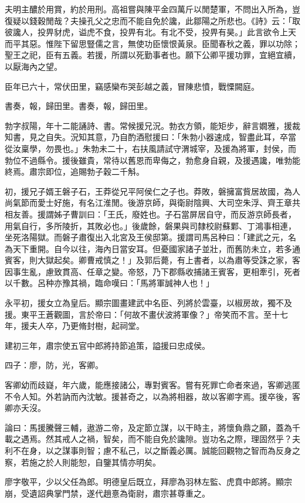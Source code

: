 \begin{pinyinscope}
夫明主醲於用賞，約於用刑。高祖嘗與陳平金四萬斤以閒楚軍，不問出入所為，豈復疑以錢穀閒哉？夫操孔父之忠而不能自免於讒，此鄒陽之所悲也。《詩》云：「取彼讒人，投畀豺虎，谥虎不食，投畀有北。有北不受，投畀有昊。」此言欲令上天而平其惡。惟陛下留思豎儒之言，無使功臣懷恨黃泉。臣聞春秋之義，罪以功除；聖王之祀，臣有五義。若援，所謂以死勤事者也。願下公卿平援功罪，宜絕宜續，以厭海內之望。

臣年已六十，常伏田里，竊感欒布哭彭越之義，冒陳悲憤，戰慄闕庭。

書奏，報，歸田里。書奏，報，歸田里。

勃字叔陽，年十二能誦詩、書。常候援兄況。勃衣方領，能矩步，辭言嫺雅，援裁知書，見之自失。況知其意，乃自酌酒慰援曰：「朱勃小器速成，智盡此耳，卒當從汝稟學，勿畏也。」朱勃未二十，右扶風請試守渭城宰，及援為將軍，封侯，而勃位不過縣令。援後雖貴，常待以舊恩而卑侮之，勃愈身自親，及援遇讒，唯勃能終焉。肅宗即位，追賜勃子穀二千斛。

初，援兄子婿王磐子石，王莽從兄平阿侯仁之子也。莽敗，磐擁富貲居故國，為人尚氣節而愛士好施，有名江淮閒。後游京師，與衛尉陰興、大司空朱浮、齊王章共相友善。援謂姊子曹訓曰：「王氏，廢姓也。子石當屏居自守，而反游京師長者，用氣自行，多所陵折，其敗必也。」後歲餘，磐果與司隸校尉蘇鄴、丁鴻事相連，坐死洛陽獄。而磐子肅復出入北宮及王侯邸第。援謂司馬呂种曰：「建武之元，名為天下重開。自今以往，海內日當安耳。但憂國家諸子並壯，而舊防未立，若多通賓客，則大獄起矣。卿曹戒慎之！」及郭后薨，有上書者，以為肅等受誅之家，客因事生亂，慮致貫高、任章之變。帝怒，乃下郡縣收捕諸王賓客，更相牽引，死者以千數。呂种亦豫其禍，臨命嘆曰：「馬將軍誠神人也！」

永平初，援女立為皇后。顯宗圖畫建武中名臣、列將於雲臺，以椒房故，獨不及援。東平王蒼觀圖，言於帝曰：「何故不畫伏波將軍像？」帝笑而不言。至十七年，援夫人卒，乃更脩封樹，起祠堂。

建初三年，肅宗使五官中郎將持節追策，謚援曰忠成侯。

四子：廖，防，光，客卿。

客卿幼而歧嶷，年六歲，能應接諸公，專對賓客。嘗有死罪亡命者來過，客卿逃匿不令人知。外若訥而內沈敏。援甚奇之，以為將相器，故以客卿字焉。援卒後，客卿亦夭沒。

論曰：馬援騰聲三輔，遨游二帝，及定節立謀，以干時主，將懷負鼎之願，蓋為千載之遇焉。然其戒人之禍，智矣，而不能自免於讒隙。豈功名之際，理固然乎？夫利不在身，以之謀事則智；慮不私己，以之斷義必厲。誠能回觀物之智而為反身之察，若施之於人則能恕，自鑒其情亦明矣。

廖字敬平，少以父任為郎。明德皇后既立，拜廖為羽林左監、虎賁中郎將。顯宗崩，受遺詔典掌門禁，遂代趙憙為衛尉，肅宗甚尊重之。


\end{pinyinscope}
